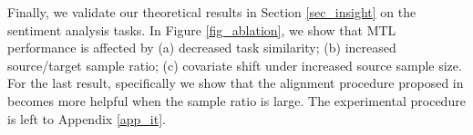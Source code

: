 Finally, we validate our theoretical results in Section \ref{sec_insight} on the sentiment analysis tasks.
In Figure \ref{fig_ablation}, we show that MTL performance is affected by
(a) decreased task similarity;
(b) increased source/target sample ratio;
(c) covariate shift under increased source sample size.
For the last result, specifically we show that the alignment procedure proposed in \cite{WZR20} becomes more helpful when the sample ratio is large.
The experimental procedure is left to Appendix \ref{app_it}.


